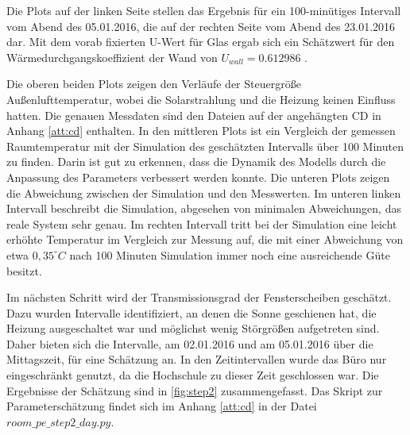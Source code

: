 Die Plots auf der linken Seite stellen das Ergebnis für ein 100-minütiges Intervall vom Abend des 05.01.2016, die auf der rechten Seite vom Abend des 23.01.2016 dar. Mit dem vorab fixierten U-Wert für Glas ergab sich ein Schätzwert für den Wärmedurchgangskoeffizient der Wand von $U_{wall}=0.612986$ .

Die oberen beiden Plots zeigen den Verläufe der Steuergröße Außenlufttemperatur, wobei die Solarstrahlung und die Heizung keinen Einfluss hatten. Die genauen Messdaten sind den Dateien auf der angehängten CD in Anhang \ref{att:cd} enthalten. In den mittleren Plots ist ein Vergleich der gemessen Raumtemperatur mit der Simulation des geschätzten Intervalls über 100 Minuten zu finden. Darin ist gut zu erkennen, dass die Dynamik des Modells durch die Anpassung des Parameters verbessert werden konnte. Die unteren Plots zeigen die Abweichung zwischen der Simulation und den Messwerten. Im unteren linken Intervall beschreibt die Simulation, abgesehen von minimalen Abweichungen, das reale System sehr genau. Im rechten Intervall tritt bei der Simulation eine leicht erhöhte Temperatur im Vergleich zur Messung auf, die mit einer Abweichung von etwa $0,35^{\circ}C$ nach 100 Minuten Simulation immer noch eine ausreichende Güte besitzt.

Im nächsten Schritt wird der Transmissionsgrad der Fensterscheiben geschätzt. Dazu wurden Intervalle identifiziert, an denen die Sonne geschienen hat, die Heizung ausgeschaltet war und möglichst wenig Störgrößen aufgetreten sind. Daher bieten sich die Intervalle, am 02.01.2016 und am 05.01.2016 über die Mittagszeit, für eine Schätzung an. In den Zeitintervallen wurde das Büro nur eingeschränkt genutzt, da die Hochschule zu dieser Zeit geschlossen war. Die Ergebnisse der Schätzung sind in \ref{fig:step2} zusammengefasst. Das Skript zur Parameterschätzung findet sich im Anhang \ref{att:cd} in der Datei $room\_pe\_step2\_day.py$.

